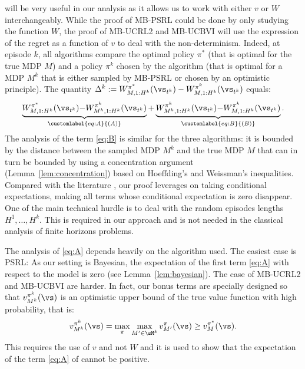 will be very useful in our analysis as it allows us to work with either $v$ or $W$ interchangeably. While the proof of MB-PSRL could be done by only studying the function $W$, the proof of MB-UCRL2 and MB-UCBVI will use the expression of the regret as a function of $v$ to deal with the non-determinism. Indeed, at episode $k$, all algorithms compare the optimal policy $\pi^*$ (that is optimal for the true MDP $M$) and a policy $\pi^k$ chosen by the algorithm (that is optimal for a MDP $M^k$ that is either sampled by MB-PSRL or chosen by an optimistic principle).  The quantity $\Delta^k := W_{M,1:H^k}^{\pi^*}(\vs_{t^k}) - W_{M,1:H^k}^{\pi^k}(\vs_{t^k})$ equals:
\begin{align}
    \underbrace{W_{M,1:H^k}^{\pi^*}(\vs_{t^k}) {-} W_{M^k,1:H^k}^{\pi^k}(\vs_{t^k})}_{\customlabel{eq:A}{(A)}}%
    + \underbrace{W_{M^k,1:H^k}^{\pi^k}(\vs_{t^k}) {-} W_{M,1:H^k}^{\pi^k}(\vs_{t^k})}_{\customlabel{eq:B}{(B)}}.
    \label{eq:proofAB}%
\end{align}
The analysis of the term \ref{eq:B} is similar for the three algorithms: it is bounded by the distance between the sampled MDP $M^k$ and the true MDP $M$ that can in turn be bounded by using a concentration argument (Lemma~\ref{lem:concentration}) based on Hoeffding's and Weissman's inequalities.  Compared with the literature \cite{azar2017minimax,ouyang2017learning}, our proof leverages on taking conditional expectations, making all terms whose conditional expectation is zero disappear. One of the main technical hurdle is to deal with the random episodes lengths $H^1,\ldots, H^k$.   This is required in our approach and is not needed in the classical analysis of finite horizons problems.

The analysis of \ref{eq:A} depends heavily on the algorithm used. The easiest case is PSRL: As our setting is Bayesian, the expectation of the first term \ref{eq:A} with respect to the model is zero (see Lemma~\ref{lem:bayesian}).   The case of MB-UCRL2 and MB-UCBVI are harder. In fact, our bonus terms are specially designed so that $v_{M^k}^{\pi^k}(\vs)$ is an optimistic upper bound of the true value function with high probability, that is:
\begin{align}
    \label{eq:optimism}
    v_{M^k}^{\pi^k}(\vs) = \max_{\pi} \max_{M'\in\sM^k} v_{M'}^{\pi}(\vs) \ge v_M^{\pi^*}(\vs).
\end{align}
This requires the use of $v$ and not $W$ and it is used to show that the expectation of the term \ref{eq:A} of  cannot be positive. 

